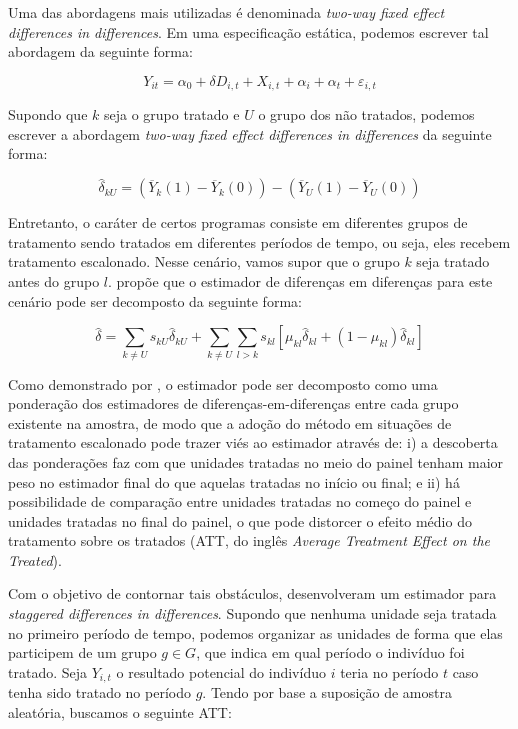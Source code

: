 Uma das abordagens mais utilizadas é denominada \textit{two-way fixed effect differences in differences}. Em uma especificação estática, podemos escrever tal abordagem da seguinte forma:

\begin{equation}
    Y_{it} = \alpha_0 + \delta D_{i,t} + X_{i,t} + \alpha_i + \alpha_t + \varepsilon_{i,t}
\end{equation}

Supondo que $k$ seja o grupo tratado e $U$ o grupo dos não tratados, podemos escrever a abordagem \textit{two-way fixed effect differences in differences} da seguinte forma:

\begin{equation}
    \hat{\delta}_{kU} = (\overline{Y}_k(1) - \overline{Y}_k(0)) -  (\overline{Y}_U(1) - \overline{Y}_U(0))
\end{equation}

Entretanto, o caráter de certos programas consiste em diferentes grupos de tratamento sendo tratados em diferentes períodos de tempo, ou seja, eles recebem tratamento escalonado. Nesse cenário, vamos supor que o grupo $k$ seja tratado antes do grupo $l$. \cite{Bacon_2021} propõe que o estimador de diferenças em diferenças para este cenário pode ser decomposto da seguinte forma:

\begin{equation}
    \hat{\delta} = \sum_{k \neq U} s_{kU}\hat{\delta}_{kU}+\sum_{k \neq U}\sum_{l>k}s_{kl}[\mu_{kl}\hat{\delta}_{kl} + (1-\mu_{kl})\hat{\delta}_{kl}]
\end{equation}

Como demonstrado por \cite{Bacon_2021}, o estimador pode ser decomposto como uma ponderação dos estimadores de diferenças-em-diferenças entre cada grupo existente na amostra, de modo que a adoção do método em situações de tratamento escalonado pode trazer viés ao estimador através de: i) a descoberta das ponderações faz com que unidades tratadas no meio do painel tenham maior peso no estimador final do que aquelas tratadas no início ou final; e ii) há possibilidade de comparação entre unidades tratadas no começo do painel e unidades tratadas no final do painel, o que pode distorcer o efeito médio do tratamento sobre os tratados (ATT, do inglês \textit{Average Treatment Effect on the Treated}).

Com o objetivo de contornar tais obstáculos, \cite{CB_2021} desenvolveram um estimador para \textit{staggered differences in differences}. Supondo que nenhuma unidade seja tratada no primeiro período de tempo, podemos organizar as unidades de forma que elas participem de um grupo $g \in G$, que indica em qual período o indivíduo foi tratado. Seja $Y_{i,t}$ o resultado potencial do indivíduo $i$ teria no período $t$ caso tenha sido tratado no período $g$. Tendo por base a suposição de amostra aleatória, buscamos o seguinte ATT:

